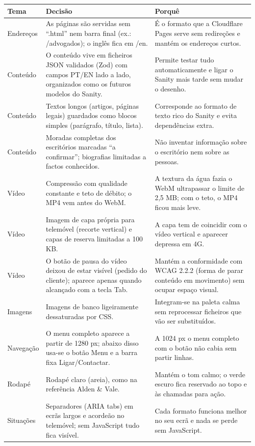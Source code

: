 \begin{longtable}{p{3.2cm}p{6.4cm}p{5.4cm}}
\toprule
\textbf{Tema} & \textbf{Decisão} & \textbf{Porquê} \\
\midrule
\endhead
Endereços & As páginas são servidas sem ``.html'' nem barra final (ex.: /advogados); o inglês fica em /en. & É o formato que a Cloudflare Pages serve sem redireções e mantém os endereços curtos. \\
Conteúdo & O conteúdo vive em ficheiros JSON validados (Zod) com campos PT/EN lado a lado, organizados como os futuros modelos do Sanity. & Permite testar tudo automaticamente e ligar o Sanity mais tarde sem mudar o desenho. \\
Conteúdo & Textos longos (artigos, páginas legais) guardados como blocos simples (parágrafo, título, lista). & Corresponde ao formato de texto rico do Sanity e evita dependências extra. \\
Conteúdo & Moradas completas dos escritórios marcadas ``a confirmar''; biografias limitadas a factos conhecidos. & Não inventar informação sobre o escritório nem sobre as pessoas. \\
Vídeo & Compressão com qualidade constante e teto de débito; o MP4 vem antes do WebM. & A textura da água fazia o WebM ultrapassar o limite de 2,5 MB; com o teto, o MP4 ficou mais leve. \\
Vídeo & Imagem de capa própria para telemóvel (recorte vertical) e capas de reserva limitadas a 100 KB. & A capa tem de coincidir com o vídeo vertical e aparecer depressa em 4G. \\
Vídeo & O botão de pausa do vídeo deixou de estar visível (pedido do cliente); aparece apenas quando alcançado com a tecla Tab. & Mantém a conformidade com WCAG 2.2.2 (forma de parar conteúdo em movimento) sem ocupar espaço visual. \\
Imagens & Imagens de banco ligeiramente dessaturadas por CSS. & Integram-se na paleta calma sem reprocessar ficheiros que vão ser substituídos. \\
Navegação & O menu completo aparece a partir de 1280 px; abaixo disso usa-se o botão Menu e a barra fixa Ligar/Contactar. & A 1024 px o menu completo com o botão não cabia sem partir linhas. \\
Rodapé & Rodapé claro (areia), como na referência Alden \& Vale. & Mantém o tom calmo; o verde escuro fica reservado ao topo e às chamadas para ação. \\
Situações & Separadores (ARIA tabs) em ecrãs largos e acordeão no telemóvel; sem JavaScript tudo fica visível. & Cada formato funciona melhor no seu ecrã e nada se perde sem JavaScript. \\

\end{longtable}
